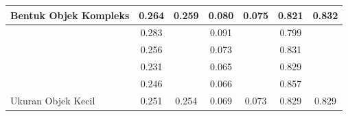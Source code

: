 \begin{table}[]
\begin{tabular}{|l|cc|cc|cc|}
  \multirow{-5}{*}{Bentuk Objek Kompleks}         & \multicolumn{1}{l|}{0.264}                         & \multirow{-5}{*}{\cellcolor[HTML]{FFFFFF}0.259} & \multicolumn{1}{l|}{0.080}                         & \multirow{-5}{*}{\cellcolor[HTML]{FFFFFF}0.075} & \multicolumn{1}{l|}{0.821}                         & \multirow{-5}{*}{\cellcolor[HTML]{FFFFFF}0.832} \\ \hline
                                                      & \multicolumn{1}{c|}{\cellcolor[HTML]{FFFFFF}0.283} & \cellcolor[HTML]{FFFFFF}                         & \multicolumn{1}{c|}{\cellcolor[HTML]{FFFFFF}0.091} & \cellcolor[HTML]{FFFFFF}                           & \multicolumn{1}{c|}{\cellcolor[HTML]{FFFFFF}0.799} & \cellcolor[HTML]{FFFFFF}                        \\ \cline{2-2} \cline{4-4} \cline{6-6}
                                                      & \multicolumn{1}{c|}{\cellcolor[HTML]{FFFFFF}0.256} & \cellcolor[HTML]{FFFFFF}                         & \multicolumn{1}{c|}{\cellcolor[HTML]{FFFFFF}0.073} & \cellcolor[HTML]{FFFFFF}                           & \multicolumn{1}{c|}{\cellcolor[HTML]{FFFFFF}0.831} & \cellcolor[HTML]{FFFFFF}                        \\ \cline{2-2} \cline{4-4} \cline{6-6}
                                                      & \multicolumn{1}{c|}{\cellcolor[HTML]{FFFFFF}0.231} & \cellcolor[HTML]{FFFFFF}                         & \multicolumn{1}{c|}{\cellcolor[HTML]{FFFFFF}0.065} & \cellcolor[HTML]{FFFFFF}                           & \multicolumn{1}{c|}{\cellcolor[HTML]{FFFFFF}0.829} & \cellcolor[HTML]{FFFFFF}                        \\ \cline{2-2} \cline{4-4} \cline{6-6}
                                                      & \multicolumn{1}{c|}{\cellcolor[HTML]{FFFFFF}0.246} & \cellcolor[HTML]{FFFFFF}                         & \multicolumn{1}{c|}{\cellcolor[HTML]{FFFFFF}0.066} & \cellcolor[HTML]{FFFFFF}                           & \multicolumn{1}{c|}{\cellcolor[HTML]{FFFFFF}0.857} & \cellcolor[HTML]{FFFFFF}                        \\ \cline{2-2} \cline{4-4} \cline{6-6}
  \multirow{-5}{*}{Ukuran Objek Kecil}            & \multicolumn{1}{c|}{\cellcolor[HTML]{FFFFFF}0.251} & \multirow{-5}{*}{\cellcolor[HTML]{FFFFFF}0.254} & \multicolumn{1}{c|}{\cellcolor[HTML]{FFFFFF}0.069} & \multirow{-5}{*}{\cellcolor[HTML]{FFFFFF}0.073} & \multicolumn{1}{c|}{\cellcolor[HTML]{FFFFFF}0.829} & \multirow{-5}{*}{\cellcolor[HTML]{FFFFFF}0.829} \\ \hline

\end{tabular}
\end{table}
